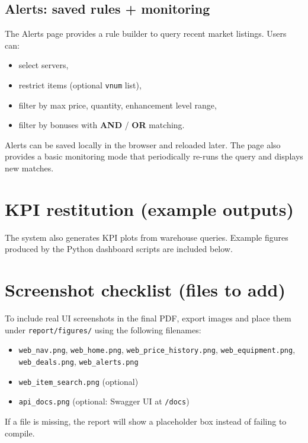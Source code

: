 \subsection{Alerts: saved rules + monitoring}
The Alerts page provides a rule builder to query recent market listings.
Users can:
\begin{itemize}
  \item select servers,
  \item restrict items (optional \texttt{vnum} list),
  \item filter by max price, quantity, enhancement level range,
  \item filter by bonuses with \textbf{AND} / \textbf{OR} matching.
\end{itemize}
Alerts can be saved locally in the browser and reloaded later.
The page also provides a basic monitoring mode that periodically re-runs the query and displays new matches.

\section{KPI restitution (example outputs)}
The system also generates KPI plots from warehouse queries. Example figures produced by the Python dashboard scripts are included below.

\section{Screenshot checklist (files to add)}
To include real UI screenshots in the final PDF, export images and place them under \texttt{report/figures/} using the following filenames:
\begin{itemize}
  \item \texttt{web\_nav.png}, \texttt{web\_home.png}, \texttt{web\_price\_history.png}, \texttt{web\_equipment.png}, \texttt{web\_deals.png}, \texttt{web\_alerts.png}
  \item \texttt{web\_item\_search.png} (optional)
  \item \texttt{api\_docs.png} (optional: Swagger UI at \texttt{/docs})
\end{itemize}
If a file is missing, the report will show a placeholder box instead of failing to compile.

